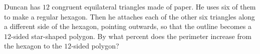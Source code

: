 Duncan has $12$ congruent equilateral triangles made of paper. He uses six of them to make a regular hexagon. Then he attaches each of the other six triangles along a different side of the hexagon, pointing outwards, so that the outline becomes a $12$-sided star-shaped polygon. By what percent does the perimeter increase from the hexagon to the $12$-sided polygon?
